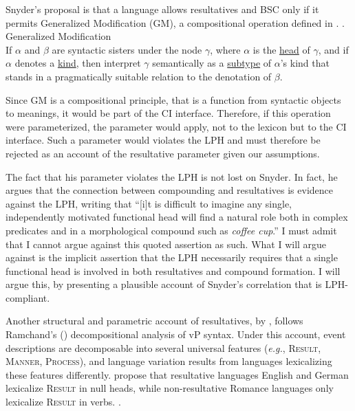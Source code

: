 \documentclass[MilwayThesis]{subfiles}
\begin{document}
Snyder's proposal is that a language allows resultatives and BSC only if it permits Generalized Modification (GM), a compositional operation defined in \Next.
\ex. Generalized Modification \parencite{snyder2012parameter}\\
If $\alpha$ and $\beta$ are syntactic sisters under the node $\gamma$, where $\alpha$ is the \uline{head} of $\gamma$, and if $\alpha$ denotes a \uline{kind}, then interpret $\gamma$ semantically as a \uline{subtype} of $\alpha$'s kind that stands in a pragmatically suitable relation to the denotation of $\beta$.

Since GM is a compositional principle, that is a function from syntactic objects to meanings, it would be part of the CI interface.
Therefore, if this operation were parameterized, the parameter would apply, not to the lexicon but to the CI interface.
Such a parameter would violates the LPH and must therefore be rejected as an account of the resultative parameter given our assumptions.

The fact that his parameter violates the LPH is not lost on Snyder.
In fact, he argues that the connection between compounding and resultatives is evidence against the LPH, writing that ``[i]t is difficult to imagine any single, independently motivated functional head will find a natural role both in complex predicates and in a morphological compound such as \textit{coffee cup}.'' \parencite[62]{snyder1995language}
I must admit that I cannot argue against this quoted assertion as such.
What I will argue against is the implicit assertion that the LPH necessarily requires that a single functional head is involved in both resultatives and compound formation.
I will argue this, by presenting a plausible account of Snyder's correlation that is LPH-compliant.

Another structural and parametric account of resultatives, by \textcite{son2008microparameters}, follows Ramchand's (\citeyear{ramchand2008verb}) decompositional analysis of vP syntax.
Under this account, event descriptions are decomposable into several universal features (\textit{e.g.}, \textsc{Result}, \textsc{Manner}, \textsc{Process}), and language variation results from languages lexicalizing these features differently.
\textcite{son2008microparameters} propose that resultative languages English and German lexicalize \textsc{Result} in null heads, while non-resultative Romance languages only lexicalize \textsc{Result} in verbs.
\ex.
\end{document}
